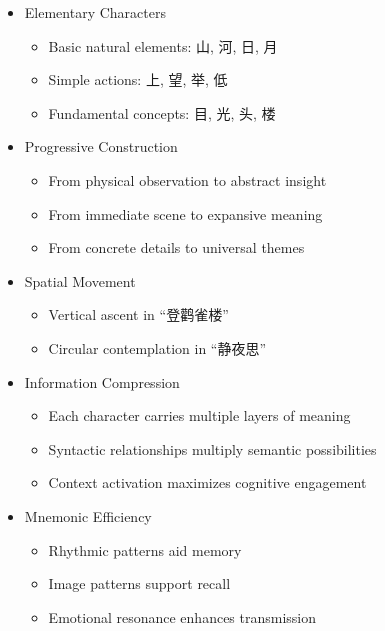 \documentclass[
]{article}
\providecommand{\tightlist}{%
  \setlength{\itemsep}{0pt}\setlength{\parskip}{0pt}}
\begin{document}
\begin{itemize}
\tightlist
\item
  Elementary Characters

  \begin{itemize}
  \tightlist
  \item
    Basic natural elements: 山, 河, 日, 月
  \item
    Simple actions: 上, 望, 举, 低
  \item
    Fundamental concepts: 目, 光, 头, 楼
  \end{itemize}
\item
  Progressive Construction

  \begin{itemize}
  \tightlist
  \item
    From physical observation to abstract insight
  \item
    From immediate scene to expansive meaning
  \item
    From concrete details to universal themes
  \end{itemize}
\item
  Spatial Movement

  \begin{itemize}
  \tightlist
  \item
    Vertical ascent in ``登鹳雀楼''
  \item
    Circular contemplation in ``静夜思''
  \end{itemize}
\item
  Information Compression

  \begin{itemize}
  \tightlist
  \item
    Each character carries multiple layers of meaning
  \item
    Syntactic relationships multiply semantic possibilities
  \item
    Context activation maximizes cognitive engagement
  \end{itemize}
\item
  Mnemonic Efficiency

  \begin{itemize}
  \tightlist
  \item
    Rhythmic patterns aid memory
  \item
    Image patterns support recall
  \item
    Emotional resonance enhances transmission
  \end{itemize}
\end{itemize}
\end{document}
